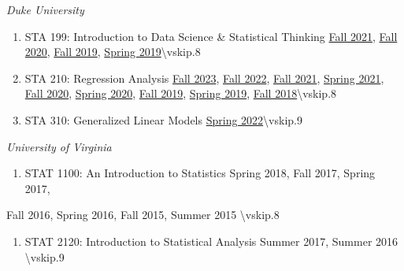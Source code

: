 \documentclass[11pt,dvipsnames]{article}
\providecommand{\tightlist}{%
  \setlength{\itemsep}{0pt}\setlength{\parskip}{0pt}}
\begin{document}
\emph{Duke University}

\begin{enumerate}
\def\labelenumi{\arabic{enumi}.}
\item
  STA 199: Introduction to Data Science \& Statistical Thinking \hfill
  \href{sta199-fa21-003.netlify.app}{Fall 2021},
  \href{https://sta199-fa20-002.netlify.app}{Fall 2020},
  \href{https://www2.stat.duke.edu/courses/Fall19/sta199.001/}{Fall
  2019}, \newline\hspace*{\fill}
  \href{https://www2.stat.duke.edu/courses/Spring19/sta199.001/}{Spring
  2019}\textbackslash vskip.8\baselineskip
\item
  STA 210: Regression Analysis
  \hfill \href{https://sta210-fa23.netlify.app}{Fall 2023},
  \href{https://sta210-fa22.netlify.app}{Fall 2022},
  \href{https://sta210-fa21.netlify.app}{Fall 2021},
  \href{https://sta210-sp21.netlify.app}{Spring 2021},
  \href{https://sta210-fa20.netlify.app}{Fall 2020},
  \newline \hspace*{\fill}
  \href{https://www2.stat.duke.edu/courses/Spring20/sta210.001/}{Spring 2020},
  \href{https://www2.stat.duke.edu/courses/Fall19/sta210.001/}{Fall
  2019},
  \href{https://www2.stat.duke.edu/courses/Spring19/sta210.001/}{Spring
  2019},
  \href{https://www2.stat.duke.edu/courses/Fall18/sta210.001/}{Fall
  2018}\hfill \textbackslash vskip.8\baselineskip
\item
  STA 310: Generalized Linear Models \hfill
  \href{https://sta310-sp22.netlify.app}{Spring 2022}\textbackslash vskip.9\baselineskip
\end{enumerate}

\emph{University of Virginia}

\begin{enumerate}
\def\labelenumi{\arabic{enumi}.}
\setcounter{enumi}{3}
\tightlist
\item
  STAT 1100: An Introduction to Statistics \hfill Spring 2018, Fall
  2017, Spring 2017,
\end{enumerate}

\hfill Fall 2016, Spring 2016, Fall 2015, Summer 2015
\textbackslash vskip.8\baselineskip

\begin{enumerate}
\def\labelenumi{\arabic{enumi}.}
\setcounter{enumi}{4}
\tightlist
\item
  STAT 2120: Introduction to Statistical Analysis \hfill Summer 2017,
  Summer 2016 \textbackslash vskip.9\baselineskip
\end{enumerate}
\end{document}
